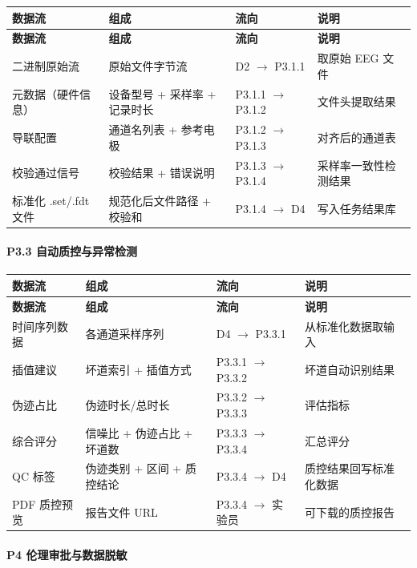 {\small
\begin{longtable}{|p{28mm}|p{52mm}|p{30mm}|p{22mm}|}
\hline
\textbf{数据流} & \textbf{组成} & \textbf{流向} & \textbf{说明}\\\hline
\endfirsthead
\hline
\textbf{数据流} & \textbf{组成} & \textbf{流向} & \textbf{说明}\\\hline
\endhead
二进制原始流 & 原始文件字节流 & D2 $\to$ P3.1.1 & 取原始 EEG 文件 \\ \hline
元数据（硬件信息）& 设备型号 + 采样率 + 记录时长 & P3.1.1 $\to$ P3.1.2 & 文件头提取结果 \\ \hline
导联配置 & 通道名列表 + 参考电极 & P3.1.2 $\to$ P3.1.3 & 对齐后的通道表 \\ \hline
校验通过信号 & 校验结果 + 错误说明 & P3.1.3 $\to$ P3.1.4 & 采样率一致性检测结果 \\ \hline
标准化 .set/.fdt 文件 & 规范化后文件路径 + 校验和 & P3.1.4 $\to$ D4 & 写入任务结果库 \\ \hline
\end{longtable}
}

\paragraph{P3.3 自动质控与异常检测}

{\small
\begin{longtable}{|p{28mm}|p{52mm}|p{30mm}|p{22mm}|}
\hline
\textbf{数据流} & \textbf{组成} & \textbf{流向} & \textbf{说明}\\\hline
\endfirsthead
\hline
\textbf{数据流} & \textbf{组成} & \textbf{流向} & \textbf{说明}\\\hline
\endhead
时间序列数据 & 各通道采样序列 & D4 $\to$ P3.3.1 & 从标准化数据取输入 \\ \hline
插值建议 & 坏道索引 + 插值方式 & P3.3.1 $\to$ P3.3.2 & 坏道自动识别结果 \\ \hline
伪迹占比 & 伪迹时长/总时长 & P3.3.2 $\to$ P3.3.3 & 评估指标 \\ \hline
综合评分 & 信噪比 + 伪迹占比 + 坏道数 & P3.3.3 $\to$ P3.3.4 & 汇总评分 \\ \hline
QC 标签 & 伪迹类别 + 区间 + 质控结论 & P3.3.4 $\to$ D4 & 质控结果回写标准化数据 \\ \hline
PDF 质控预览 & 报告文件 URL & P3.3.4 $\to$ 实验员 & 可下载的质控报告 \\ \hline
\end{longtable}
}

\paragraph{P4 伦理审批与数据脱敏}


